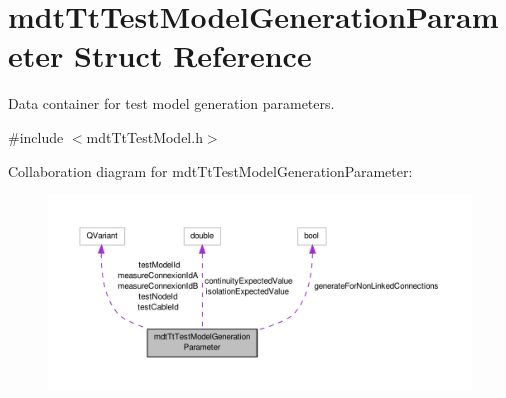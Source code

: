 \hypertarget{structmdt_tt_test_model_generation_parameter}{\section{mdt\-Tt\-Test\-Model\-Generation\-Parameter Struct Reference}
\label{structmdt_tt_test_model_generation_parameter}
}


Data container for test model generation parameters.  




{\ttfamily \#include $<$mdt\-Tt\-Test\-Model.\-h$>$}



Collaboration diagram for mdt\-Tt\-Test\-Model\-Generation\-Parameter\-:
\nopagebreak
\begin{figure}[H]
\begin{center}
\leavevmode
\includegraphics[width=350pt]{structmdt_tt_test_model_generation_parameter__coll__graph}
\end{center}
\end{figure}
